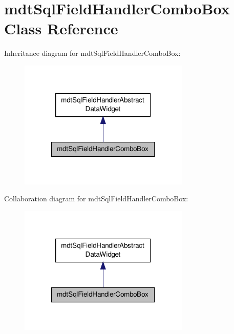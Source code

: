 \hypertarget{classmdt_sql_field_handler_combo_box}{\section{mdt\-Sql\-Field\-Handler\-Combo\-Box Class Reference}
\label{classmdt_sql_field_handler_combo_box}
}


Inheritance diagram for mdt\-Sql\-Field\-Handler\-Combo\-Box\-:
\nopagebreak
\begin{figure}[H]
\begin{center}
\leavevmode
\includegraphics[width=230pt]{classmdt_sql_field_handler_combo_box__inherit__graph}
\end{center}
\end{figure}


Collaboration diagram for mdt\-Sql\-Field\-Handler\-Combo\-Box\-:
\nopagebreak
\begin{figure}[H]
\begin{center}
\leavevmode
\includegraphics[width=230pt]{classmdt_sql_field_handler_combo_box__coll__graph}
\end{center}
\end{figure}
